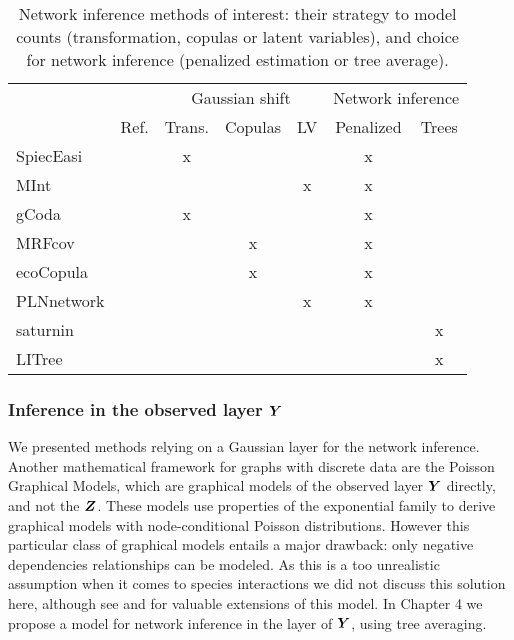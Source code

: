 \begin{table}[H]
\begin{tabular}{l|l|ccc|cc|}
\cline{3-7}
\multicolumn{1}{l}{} &\multicolumn{1}{l|}{}& \multicolumn{3}{c|}{ Gaussian shift} & \multicolumn{2}{c|}{Network inference}  \\ \cline{2-7} 
&\multicolumn{1}{l|}{Ref.}& Trans.  & Copulas &LV & Penalized & Trees  \\ \hline
\multicolumn{1}{|l|}{SpiecEasi} &\citet{kurtz}& x &  &  & x &   \\ \hline
\multicolumn{1}{|l|}{MInt} & \citet{MInt}&  &  & x & x &    \\ \hline
\multicolumn{1}{|l|}{gCoda} & \citet{gcoda}& x &  &  & x &   \\ \hline
\multicolumn{1}{|l|}{MRFcov} &\citet{CWL18}&  &  x&  & x &   \\ \hline
\multicolumn{1}{|l|}{ecoCopula} &\citet{PWT19}&  &  x&  & x &    \\ \hline
\multicolumn{1}{|l|}{PLNnetwork} &\citet{CMR19}&  &  &x  & x &    \\ \hline
\multicolumn{1}{|l|}{saturnin} &\citet{SRS19}& \multicolumn{1}{l}{\cellcolor[HTML]{d8d8d8}} & \multicolumn{1}{l}{\cellcolor[HTML]{d8d8d8}} & \multicolumn{1}{l|}{\cellcolor[HTML]{d8d8d8}} & \multicolumn{1}{l}{} & \multicolumn{1}{c|}{x}  \\ \hline
\multicolumn{1}{|l|}{LITree} &\citet{RAR19}& \multicolumn{1}{l}{\cellcolor[HTML]{d8d8d8}} & \multicolumn{1}{l}{\cellcolor[HTML]{d8d8d8}} & \multicolumn{1}{l|}{\cellcolor[HTML]{d8d8d8}} & \multicolumn{1}{l}{} & \multicolumn{1}{c|}{x}  \\ \hline
\end{tabular}
\caption{Network inference methods of interest: their strategy to model counts (transformation, copulas or latent variables), and choice for network inference (penalized estimation or tree average).}
\label{tab:infmeth}
\end{table} 

\subsubsection*{Inference in the observed layer ${\boldsymbol{Y}}$}
We presented methods relying on a Gaussian layer for the network inference.  Another mathematical framework for graphs with discrete data are the Poisson Graphical Models, which are  graphical models of the observed layer ${\boldsymbol{Y}}$ directly, and not the ${\boldsymbol{Z}}$. These models use properties of the exponential family to derive graphical models with node-conditional Poisson distributions. However this particular class of graphical models entails a major drawback: only negative dependencies relationships can be modeled. As this is a too unrealistic assumption when it comes to species interactions we did not discuss this solution here, although see \citet{YRA13} and \citet{IRD16} for valuable extensions of this model. In Chapter 4 we propose a model for network inference in the layer of  ${\boldsymbol{Y}}$, using tree averaging.
 
